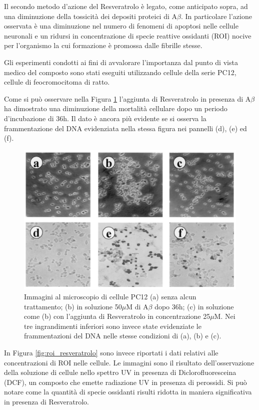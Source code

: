 \documentclass[a4paper, 12pt]{article}
\begin{document}
Il secondo metodo d'azione del Resveratrolo è legato, come anticipato sopra, ad una diminuzione della tossicità dei depositi proteici di A\(\beta\). In particolare l'azione osservata è una diminuzione nel numero di fenomeni di  apoptosi nelle cellule neuronali e un ridursi in concentrazione di specie reattive ossidanti (ROI) nocive per l'organismo la cui formazione è promossa dalle fibrille stesse.

Gli esperimenti condotti ai fini di avvalorare l'importanza dal punto di vista medico del composto sono stati eseguiti utilizzando cellule della serie PC12, cellule di feocromocitoma di ratto.

Come si può osservare nella Figura \ref{fig:apo_resveratrolo} l'aggiunta di Resveratrolo in presenza di A\(\beta\) ha dimostrato una diminuzione della mortalità cellulare dopo un periodo d'incubazione di 36h. Il dato è ancora più evidente se si osserva la frammentazione del DNA evidenziata nella stessa figura nei pannelli (d), (e) ed (f).

\begin{figure}[H]
	\centering
	\includegraphics[width=.9\linewidth]{immagini/apo_resveratrolo.png}
	\caption{Immagini al microscopio di cellule PC12 (a) senza alcun trattamento; (b) in soluzione 50$\mu$M di A\(\beta\) dopo 36h; (c) in soluzione come (b) con l'aggiunta di Resveratrolo in concentrazione 25$\mu$M. Nei tre ingrandimenti inferiori sono invece state evidenziate le frammentazioni del DNA nelle stesse condizioni di (a), (b) e (c).}
	\label{fig:apo_resveratrolo}
\end{figure}

In Figura \ref{fig:roi_resveratrolo} sono invece riportati i dati relativi alle concentrazioni di ROI nelle cellule. Le immagini sono il risultato dell'osservazione della soluzione di cellule nello spettro UV in presenza di Diclorofluoresceina (DCF), un composto che emette radiazione UV in presenza di perossidi. Si può notare come la quantità di specie ossidanti risulti ridotta in maniera significativa in presenza di Resveratrolo. \autocite{jang_protective_2003}
\end{document}
